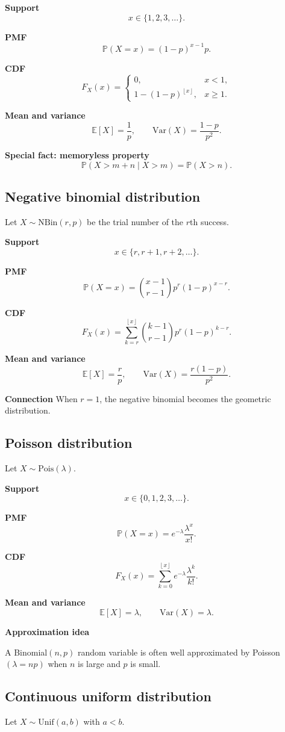 \documentclass[11pt]{article}
\newcommand{\E}{\mathbb{E}}
\newcommand{\Var}{\mathrm{Var}}
\newcommand{\Prob}{\mathbb{P}}
\newcommand{\1}{\mathbf{1}}
\newcommand{\NBin}{\mathrm{NBin}}
\newcommand{\Pois}{\mathrm{Pois}}
\newcommand{\Unif}{\mathrm{Unif}}
\newcommand{\floor}[1]{\left\lfloor #1 \right\rfloor}
\begin{document}
\textbf{Support}
\[
    x\in\{1,2,3,\dots\}.
\]

\textbf{PMF}
\[
    \Prob(X=x)=(1-p)^{x-1}p.
\]

\textbf{CDF}
\[
    F_X(x)=
    \begin{cases}
        0, & x<1,\\
        1-(1-p)^{\floor{x}}, & x\ge 1.
    \end{cases}
\]

\textbf{Mean and variance}
\[
    \E[X]=\frac{1}{p}, \qquad \Var(X)=\frac{1-p}{p^2}.
\]

\textbf{Special fact: memoryless property}
\[
    \Prob(X>m+n\mid X>m)=\Prob(X>n).
\]

\subsection{Negative binomial distribution}
Let $X\sim \NBin(r,p)$ be the trial number of the $r$th success.

\textbf{Support}
\[
    x\in\{r,r+1,r+2,\dots\}.
\]

\textbf{PMF}
\[
    \Prob(X=x)=\binom{x-1}{r-1}p^r(1-p)^{x-r}.
\]

\textbf{CDF}
\[
    F_X(x)=\sum_{k=r}^{\floor{x}} \binom{k-1}{r-1}p^r(1-p)^{k-r}.
\]

\textbf{Mean and variance}
\[
    \E[X]=\frac{r}{p}, \qquad \Var(X)=\frac{r(1-p)}{p^2}.
\]

\textbf{Connection}
When $r=1$, the negative binomial becomes the geometric distribution.

\subsection{Poisson distribution}
Let $X\sim \Pois(\lambda)$.

\textbf{Support}
\[
    x\in\{0,1,2,3,\dots\}.
\]

\textbf{PMF}
\[
    \Prob(X=x)=e^{-\lambda}\frac{\lambda^x}{x!}.
\]

\textbf{CDF}
\[
    F_X(x)=\sum_{k=0}^{\floor{x}} e^{-\lambda}\frac{\lambda^k}{k!}.
\]

\textbf{Mean and variance}
\[
    \E[X]=\lambda, \qquad \Var(X)=\lambda.
\]

\textbf{Approximation idea}

A Binomial$(n,p)$ random variable is often well approximated by Poisson$(\lambda=np)$ when $n$ is large and $p$ is small.

\subsection{Continuous uniform distribution}
Let $X\sim \Unif(a,b)$ with $a<b$.
\end{document}
